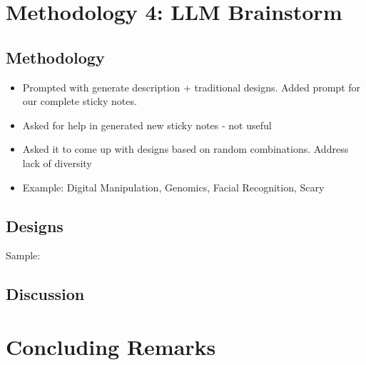 \section{Methodology 4: LLM Brainstorm}

\subsection{Methodology}
\begin{itemize}
\item Prompted with generate description + traditional designs. Added prompt for our complete sticky notes. 
\item Asked for help in generated new sticky notes - not useful
\item Asked it to come up with designs based on random combinations. Address lack of diversity
\item Example: Digital Manipulation, Genomics, Facial Recognition, Scary
\end{itemize}

\subsection{Designs}
Sample:



\subsection{Discussion}



\section{Concluding Remarks}


